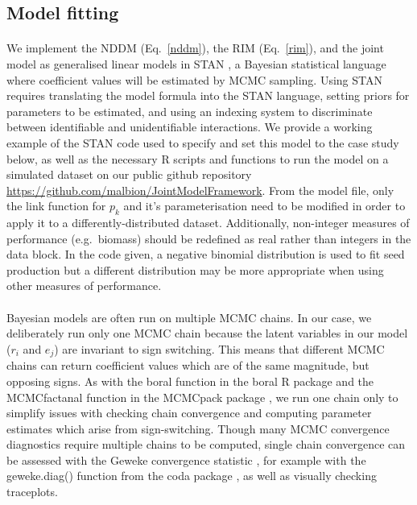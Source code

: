 \documentclass[a4,12pt]{article}
\begin{document}
    \subsection{Model fitting}

        \paragraph{}        
        We implement the NDDM (Eq.~\ref{nddm}), the RIM (Eq.~\ref{rim}), and the joint model as generalised linear models in STAN \parencite{Carpenter2017}, a Bayesian statistical language where coefficient values will be estimated by MCMC sampling. Using STAN requires translating the model formula into the STAN language, setting priors for parameters to be estimated, and using an indexing system to discriminate between identifiable and unidentifiable interactions. We provide a working example of the STAN code used to specify and set this model to the case study below, as well as the necessary R scripts and functions to run the model on a simulated dataset on our public github repository \url{https://github.com/malbion/JointModelFramework}.
        From the model file, only the link function for $p_k$ and it's parameterisation need to be modified in order to apply it to a differently-distributed dataset. Additionally, non-integer measures of performance (e.g.\ biomass) should be redefined as real rather than integers in the data block. In the code given, a negative binomial distribution is used to fit seed production but a different distribution may be more appropriate when using other measures of performance.   

        \paragraph{}
        Bayesian models are often run on multiple MCMC chains. In our case, we deliberately run only one MCMC chain because the latent variables in our model ($r_i$ and $e_j$) are invariant to sign switching. This means that different MCMC chains can return coefficient values which are of the same magnitude, but opposing signs. As with the boral function in the boral R package \parencite{Hui2021} and the MCMCfactanal function in the MCMCpack package \parencite{Martin2011}, we run one chain only to simplify issues with checking chain convergence and computing parameter estimates which arise from sign-switching. Though many MCMC convergence diagnostics require multiple chains to be computed, single chain convergence can be assessed with the Geweke convergence statistic \parencite{Geweke1992}, for example with the geweke.diag() function from the coda package \parencite{Plummer2006}, as well as visually checking traceplots.
\end{document}
